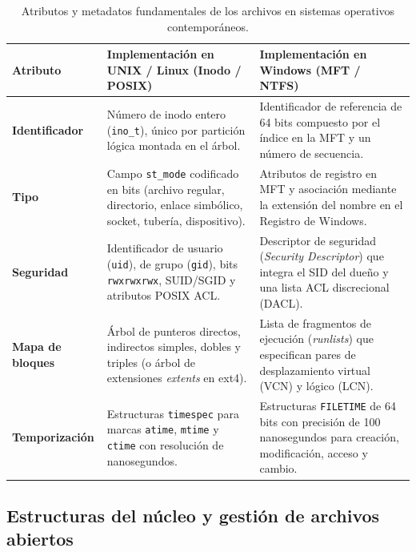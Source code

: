 \documentclass[12pt]{article}
\begin{document}
\begin{table}[H]
\centering
\footnotesize
\renewcommand{\arraystretch}{1.1}
\renewcommand{\tabularxcolumn}[1]{m{#1}}
\setlength{\emergencystretch}{1.5em}
\caption{Atributos y metadatos fundamentales de los archivos en sistemas operativos contemporáneos.}
\label{tab:atributosMetadatosArchivo}
\begin{tabularx}{\textwidth}{>{\centering\arraybackslash}m{2.9cm} X X}
\toprule
\textbf{Atributo} & \textbf{Implementación en UNIX / Linux (Inodo / POSIX)} & \textbf{Implementación en Windows (MFT / NTFS)} \\
\midrule
\textbf{Identificador} & Número de inodo entero (\texttt{ino\_t}), único por partición lógica montada en el árbol. & Identificador de referencia de 64 bits compuesto por el índice en la MFT y un número de secuencia. \\
\addlinespace
\textbf{Tipo} & Campo \texttt{st\_mode} codificado en bits (archivo regular, directorio, enlace simbólico, socket, tubería, dispositivo). & Atributos de registro en MFT y asociación mediante la extensión del nombre en el Registro de Windows. \\
\addlinespace
\textbf{Seguridad} & Identificador de usuario (\texttt{uid}), de grupo (\texttt{gid}), bits \texttt{rwxrwxrwx}, SUID/SGID y atributos POSIX ACL. & Descriptor de seguridad (\textit{Security Descriptor}) que integra el SID del dueño y una lista ACL discrecional (DACL). \\
\addlinespace
\textbf{Mapa de bloques} & Árbol de punteros directos, indirectos simples, dobles y triples (o árbol de extensiones \textit{extents} en ext4). & Lista de fragmentos de ejecución (\textit{runlists}) que especifican pares de desplazamiento virtual (VCN) y lógico (LCN). \\
\addlinespace
\textbf{Temporización} & Estructuras \texttt{timespec} para marcas \texttt{atime}, \texttt{mtime} y \texttt{ctime} con resolución de nanosegundos. & Estructuras \texttt{FILETIME} de 64 bits con precisión de 100 nanosegundos para creación, modificación, acceso y cambio. \\
\bottomrule
\end{tabularx}
\end{table}

\subsection{Estructuras del núcleo y gestión de archivos abiertos}
\label{subsec:estructurasNucleoArchivosAbiertos}
\end{document}
